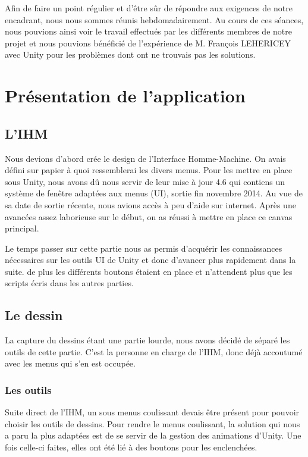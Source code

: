 \documentclass[a4paper,11pt]{article}
\begin{document}
	Afin de faire un point régulier et d'être sûr de répondre aux exigences de notre encadrant, nous nous sommes réunis hebdomadairement. Au cours de ces séances, nous pouvions ainsi voir le travail effectués par les différents membres de notre projet et nous pouvions bénéficié de l'expérience de M. François LEHERICEY avec Unity pour les problèmes dont ont ne trouvais pas les solutions.
	\section{Présentation de l'application}
		\subsection{L'IHM}
			Nous devions d'abord crée le design de l'Interface Homme-Machine. On avais défini sur papier à quoi ressemblerai les divers menus. Pour les mettre en place sous Unity, nous avons dû nous servir de leur mise à jour 4.6 qui contiens un système de fenêtre adaptées aux menus (UI), sortie fin novembre 2014. Au vue de sa date de sortie récente, nous avions accès à peu d'aide sur internet. Après une avancées assez laborieuse sur le début, on as réussi à mettre en place ce canvas principal.
			
			Le temps passer sur cette partie nous as permis d'acquérir les connaissances nécessaires sur les outils UI de Unity et donc d'avancer plus rapidement dans la suite. de plus les différents boutons étaient en place et n'attendent plus que les scripts écris dans les autres parties.
		
		\subsection{Le dessin}
			La capture du dessins étant une partie lourde, nous avons décidé de séparé les outils de cette partie. C'est la personne en charge de l'IHM, donc déjà accoutumé avec les menus qui s'en est occupée.
		
		
			\subsubsection{Les outils}
				Suite direct de l'IHM, un sous menus coulissant devais être présent pour pouvoir choisir les outils de dessins. Pour rendre le menus coulissant, la solution qui nous a paru la plus adaptées est de se servir de la gestion des animations d'Unity. Une fois celle-ci faites, elles ont été lié à des boutons pour les enclenchées. 
				
\end{document}
